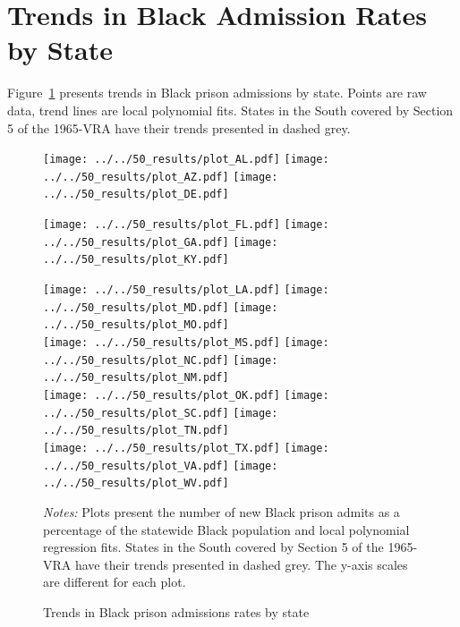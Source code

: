 \documentclass[12pt]{article}
\begin{document}
\section{Trends in Black Admission Rates by State}\label{appendix_Black_rates_states}
\setcounter{table}{0}
\setcounter{figure}{0}
\renewcommand{\thetable}{C\arabic{table}}
\renewcommand{\thefigure}{C\arabic{figure}}
\normalsize

Figure~\ref{figure_states1} presents trends in Black prison admissions by state.  Points are raw data, trend lines are local polynomial fits. States in the South covered by Section 5 of the 1965-VRA have their trends presented in dashed grey.


\begin{figure}[h!]
 	\begin{center}
 	\caption{Trends in Black prison admissions rates by state}
 	\small

 		\vspace{.1in}
      \texttt{[image: ../../50\_results/plot\_AL.pdf]}
 			\texttt{[image: ../../50\_results/plot\_AZ.pdf]}
       \texttt{[image: ../../50\_results/plot\_DE.pdf]}\\

       \vspace{.01in}

 			\texttt{[image: ../../50\_results/plot\_FL.pdf]}
       \texttt{[image: ../../50\_results/plot\_GA.pdf]}
       \texttt{[image: ../../50\_results/plot\_KY.pdf]}\\

       \vspace{.01in}

 			\texttt{[image: ../../50\_results/plot\_LA.pdf]}
 			\texttt{[image: ../../50\_results/plot\_MD.pdf]}
 			\texttt{[image: ../../50\_results/plot\_MO.pdf]} \\

       \vspace{.01in}
       \texttt{[image: ../../50\_results/plot\_MS.pdf]}
       \texttt{[image: ../../50\_results/plot\_NC.pdf]}
       \texttt{[image: ../../50\_results/plot\_NM.pdf]} \\

       \vspace{.01in}
       \texttt{[image: ../../50\_results/plot\_OK.pdf]}
 			\texttt{[image: ../../50\_results/plot\_SC.pdf]}
 			\texttt{[image: ../../50\_results/plot\_TN.pdf]}\\

			\vspace{.01in}
			\texttt{[image: ../../50\_results/plot\_TX.pdf]}
 			\texttt{[image: ../../50\_results/plot\_VA.pdf]}
       \texttt{[image: ../../50\_results/plot\_WV.pdf]}
			 \smallskip
 	\label{figure_states1}
 	\end{center}
   {\scriptsize{\emph{Notes:} Plots present the number of new Black prison admits as a percentage of the statewide Black population and local polynomial regression fits.  States in the South covered by Section 5 of the 1965-VRA have their trends presented in dashed grey. The y-axis scales are different for each plot.}}
 \end{figure} \normalsize
\end{document}
